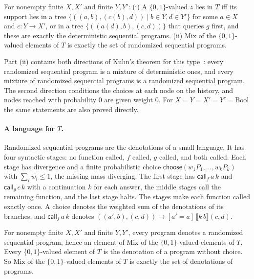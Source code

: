 \begin{theorem}
\label{thm:second-order}
For nonempty finite $X, X'$ and finite $Y, Y'$:
(i) A $\{0,1\}$-valued $z$ lies in $T$ iff its support lies in a tree
$\{((a, b), (c(b), d)) \mid b \in Y, d \in Y'\}$ for some $a \in X$ and
$c : Y \to X'$, or in a tree $\{((a(d), b), (c, d))\}$ that queries $g$
first, and these are exactly the deterministic sequential
programs.
(ii) $\mathrm{Mix}$ of the $\{0,1\}$-valued elements of $T$ is exactly the
set of randomized sequential programs.
\end{theorem}

\noindent
Part (ii) contains both directions of Kuhn's theorem for this
type~\cite{kuhn1953}: every randomized sequential program is a mixture of
deterministic ones, and every mixture of
randomized sequential programs is a randomized sequential
program. The second direction conditions the
choices at each node on the history, and nodes reached with probability
$0$ are given weight $0$. For $X = Y = X' = Y' = \mathrm{Bool}$ the same statements are also
proved directly.

\paragraph{A language for $T$.}
Randomized sequential programs are the denotations of a small
language. It has four syntactic stages: no function
called, $f$ called, $g$ called, and both called. Each stage has
divergence and a finite probabilistic choice
$\mathsf{choose}(w_1 P_1, \dots, w_k P_k)$ with $\sum_i w_i \le 1$, the
missing mass diverging. The first stage has $\mathsf{call}_f\,a\,k$ and
$\mathsf{call}_g\,c\,k$ with a continuation $k$ for each answer, the
middle stages call the remaining function, and the last stage halts. The
stages make each function called exactly once. A choice denotes the
weighted sum of the denotations of its branches, and $\mathsf{call}_f\,a\,k$
denotes $((a',b),(c,d)) \mapsto [a' = a]\,\llbracket k\,b\rrbracket(c,d)$.

\begin{theorem}
\label{thm:proglang}
For nonempty finite $X, X'$ and finite $Y, Y'$, every program denotes a
randomized sequential program, hence an element of $\mathrm{Mix}$ of the
$\{0,1\}$-valued elements of $T$. Every $\{0,1\}$-valued element of $T$
is the denotation of a program without choice. So $\mathrm{Mix}$ of the
$\{0,1\}$-valued elements of $T$ is exactly the set of denotations of
programs.
\end{theorem}

